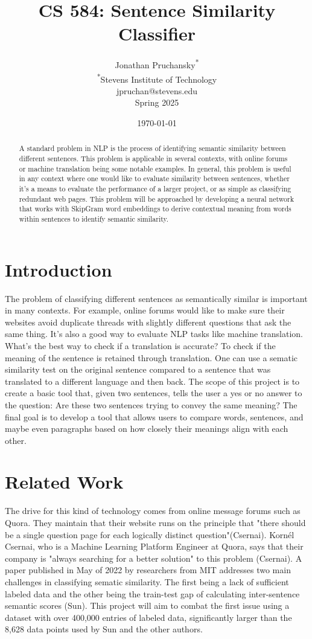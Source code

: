 \documentclass{article}
\title{CS 584: Sentence Similarity Classifier} %
\author{
Jonathan Pruchansky\textsuperscript{*}\\
\textsuperscript{*}{Stevens Institute of Technology}\\
jpruchan@stevens.edu\\
Spring 2025
}
\date{\today}
\begin{document}
\maketitle
\begin{abstract}
A standard problem in NLP is the process of identifying semantic similarity between different sentences. This problem is applicable in several contexts, with online forums or machine translation being some notable examples. In general, this problem is useful in any context where one would like to evaluate similarity between sentences, whether it's a means to evaluate the performance of a larger project, or as simple as classifying redundant web pages. This problem will be approached by developing a neural network that works with SkipGram word embeddings to derive contextual meaning from words within sentences to identify semantic similarity.
\end{abstract}

\section{Introduction}
The problem of classifying different sentences as semantically similar is important in many contexts. For example, online forums would like to make sure their websites avoid duplicate threads with slightly different questions that ask the same thing. It's also a good way to evaluate NLP tasks like machine translation. What's the best way to check if a translation is accurate? To check if the meaning of the sentence is retained through translation. One can use a sematic similarity test on the original sentence compared to a sentence that was translated to a different language and then back. The scope of this project is to create a basic tool that, given two sentences, tells the user a yes or no answer to the question: Are these two sentences trying to convey the same meaning? The final goal is to develop a tool that allows users to compare words, sentences, and maybe even paragraphs based on how closely their meanings align with each other.
\section{Related Work}
The drive for this kind of technology comes from online message forums such as Quora. They maintain that their website runs on the principle that "there should be a single question page for each logically distinct question"(Csernai). Kornél Csernai, who is a Machine Learning Platform Engineer at Quora, says that their company is "always searching for a better solution" to this problem (Csernai). A paper published in May of 2022 by researchers from MIT addresses two main challenges in classifying sematic similarity. The first being a lack of sufficient labeled data and the other being the train-test gap of calculating inter-sentence semantic scores (Sun). This project will aim to combat the first issue using a dataset with over 400,000 entries of labeled data, significantly larger than the 8,628 data points used by Sun and the other authors.
\end{document}
